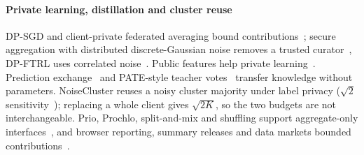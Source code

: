 \paragraph{Private learning, distillation and cluster reuse}
DP-SGD and client-private federated averaging bound contributions~\cite{abadi2016deep,mcmahan2018learning,kairouz2021advances,li2023fedsurvey};
secure aggregation with distributed discrete-Gaussian noise removes a trusted
curator~\cite{bonawitz2017practical,kairouz2021distributed,canonne2020discrete},
DP-FTRL uses correlated noise~\cite{kairouz2021ftrl}. Public features help private learning~\cite{tramer2021features,li2022large}. Prediction exchange~\cite{li2019fedmd,lin2020feddf,itahara2021dsfl,abourayya2025little,gad2023communication}
and PATE-style teacher votes~\cite{papernot2017semi,papernot2018scalable,zhu2020privateknn}
transfer knowledge without parameters. NoiseCluster reuses a noisy cluster majority under label privacy
($\sqrt2$ sensitivity~\cite{tang2022labels}); replacing a whole client gives
$\sqrt{2K}$, so the two budgets are not interchangeable.
Prio, Prochlo, split-and-mix and shuffling support aggregate-only
interfaces~\cite{corriganGibbs2017prio,bittau2017prochlo,ishai2006cryptography,erlingsson2019amplification,feldman2021hiding},
and browser reporting, summary releases and data markets bounded
contributions~\cite{erlingsson2014rappor,ghazi2025sandbox,aksu2023summary,xing2026xemis}.
